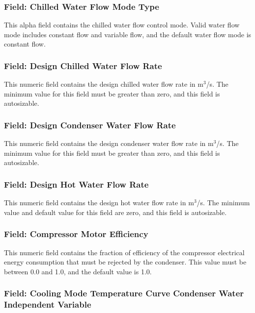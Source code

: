 \subsubsection{Field: Chilled Water Flow Mode Type}\label{field-chilled-water-flow-mode-type}

This alpha field contains the chilled water flow control mode. Valid water flow mode includes constant flow and variable flow, and the default water flow mode is constant flow.

\subsubsection{Field: Design Chilled Water Flow Rate}\label{field-design-chilled-water-flow-rate-8}

This numeric field contains the design chilled water flow rate in m\(^{3}\)/s. The minimum value for this field must be greater than zero, and this field is autosizable.

\subsubsection{Field: Design Condenser Water Flow Rate}\label{field-design-condenser-water-flow-rate-7}

This numeric field contains the design condenser water flow rate in m\(^{3}\)/s. The minimum value for this field must be greater than zero, and this field is autosizable.

\subsubsection{Field: Design Hot Water Flow Rate}\label{field-design-hot-water-flow-rate-2}

This numeric field contains the design hot water flow rate in m\(^{3}\)/s. The minimum value and default value for this field are zero, and this field is autosizable.

\subsubsection{Field: Compressor Motor Efficiency}\label{field-compressor-motor-efficiency}

This numeric field contains the fraction of efficiency of the compressor electrical energy consumption that must be rejected by the condenser. This value must be between 0.0 and 1.0, and the default value is 1.0.

\subsubsection{Field: Cooling Mode Temperature Curve Condenser Water Independent Variable}\label{field-cooling-mode-temperature-curve-condenser-water-independent-variable}

